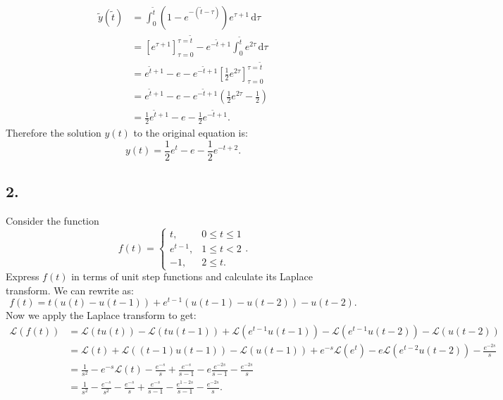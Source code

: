 \begin{align*}
  \tilde{y} \left( \tilde{t} \right) &= \int_{0}^{\tilde{t}} \left( 1 - e^{- \left( \tilde{t} - \tau \right) } \right) e^{\tau + 1} \, \mathrm{d}\tau \\
  &= \left[ e^{\tau + 1} \right]_{\tau = 0}^{\tau = \tilde{t}} - e^{-\tilde{t} + 1} \int_{0}^{\tilde{t}} e^{2\tau} \, \mathrm{d}\tau  \\
  &= e^{\tilde{t} + 1} - e - e^{-\tilde{t} +1} \left[ \frac{1}{2} e^{2\tau} \right]_{\tau = 0}^{\tau = \tilde{t}} \\
  &= e^{\tilde{t} + 1} - e - e^{- \tilde{t} + 1} \left( \frac{1}{2} e^{2\tau} - \frac{1}{2} \right)  \\
  &= \frac{1}{2} e^{\tilde{t} + 1} - e - \frac{1}{2}e^{-\tilde{t} +1}
.\end{align*}
Therefore the solution $y(t)$ to the original equation is:
\[ 
y(t) = \frac{1}{2}e^{t} - e - \frac{1}{2} e^{-t + 2}
.\]


\subsection*{2.} Consider the function
\[ 
f(t) = \begin{cases}
t, & 0 \leq t \leq 1\\
e^{t-1}, & 1 \leq t <2 \\
-1, & 2 \leq t
.\end{cases}
.\]
Express $f(t)$ in terms of unit step functions and calculate its Laplace transform.
\bigbreak
We can rewrite as:
\[ 
f(t) = t \left( u(t) - u(t-1) \right) + e^{t-1} \left( u(t-1) - u(t-2) \right) - u(t-2)
.\]
Now we apply the Laplace transform to get:
\begin{align*}
  \mathcal{L}\left( f(t) \right) &= \mathcal{L}\left( tu(t) \right) - \mathcal{L}\left( tu(t-1) \right) + \mathcal{L}\left( e^{t-1}u(t-1) \right) - \mathcal{L}\left( e^{t-1}u(t-2) \right) - \mathcal{L}\left( u(t-2) \right)  \\
  &= \mathcal{L}(t) + \mathcal{L}\left( (t-1)u(t-1) \right) - \mathcal{L}\left( u(t-1) \right) + e^{-s} \mathcal{L}\left( e^{t} \right) - e \mathcal{L}\left( e^{t-2}u(t-2) \right) - \frac{e^{-2s}}{s} \\
  &= \frac{1}{s^2} - e^{-s}\mathcal{L}\left( t \right) - \frac{e^{-s}}{s} + \frac{e^{-s}}{s-1} - e \frac{e^{-2s}}{s-1} - \frac{e^{-2s}}{s} \\
  &= \frac{1}{s^2} - \frac{e^{-s}}{s^2} - \frac{e^{-s}}{s} + \frac{e^{-s}}{s-1} - \frac{e^{1-2s}}{s-1} - \frac{e^{-2s}}{s}
.\end{align*}



